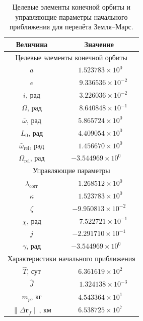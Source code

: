 \begin{table}[htbp]
	\centering
	\caption{Целевые элементы конечной орбиты и управляющие параметры начального приближения для перелёта Земля--Марс.}
	\label{tab:chap4_mars_example_parameters}
	\begin{tabular}{cc}
		\toprule
		Величина & Значение \\
		\midrule
		\multicolumn{2}{c}{Целевые элементы конечной орбиты} \\
		\midrule
		\(a\) & \(\phantom{-}1.523783\times10^{0\phantom{-}}\) \\
		\(e\) & \(\phantom{-}9.336536\times10^{-2}\) \\
		\(i\), рад & \(\phantom{-}3.226036\times10^{-2}\) \\
		\(\Omega\), рад & \(\phantom{-}8.640848\times10^{-1}\) \\
		\(\bar{\omega}\), рад & \(\phantom{-}5.865724\times10^{0\phantom{-}}\) \\
		\(L_0\), рад & \(\phantom{-}4.409054\times10^{0\phantom{-}}\) \\
		\(\bar{\omega}_{\mathrm{rel}}\), рад & \(\phantom{-}1.456670\times10^{0\phantom{-}}\) \\
		\(\Omega_{\mathrm{rel}}\), рад & \(-3.544969\times10^{0\phantom{-}}\) \\
		\midrule
		\multicolumn{2}{c}{Управляющие параметры} \\
		\midrule
		\(\lambda_{\mathrm{corr}}\) & \(\phantom{-}1.268512\times10^{0\phantom{-}}\) \\
		\(\kappa\) & \(\phantom{-}1.523783\times10^{0\phantom{-}}\) \\
		\(\zeta\) & \(-9.950813\times10^{-2}\) \\
		\(\chi\), рад & \(\phantom{-}7.522721\times10^{-1}\) \\
		\(j\) & \(-2.291710\times10^{-1}\) \\
		\(\gamma\), рад & \(-3.544969\times10^{0\phantom{-}}\) \\
		\midrule
		\multicolumn{2}{c}{Характеристики начального приближения} \\
		\midrule
		\(\widehat T\), сут & \(\phantom{-}6.361619\times10^{2\phantom{-}}\) \\
		\(\widehat J\) & \(\phantom{-}1.324138\times10^{-3}\) \\
		\(m_p\), кг & \(\phantom{-}4.543364\times10^{1\phantom{-}}\) \\
		\(\|\Delta \mathbf r_f\|\), км & \(\phantom{-}6.538725\times10^{7\phantom{-}}\) \\

\end{tabular}
\end{table}
